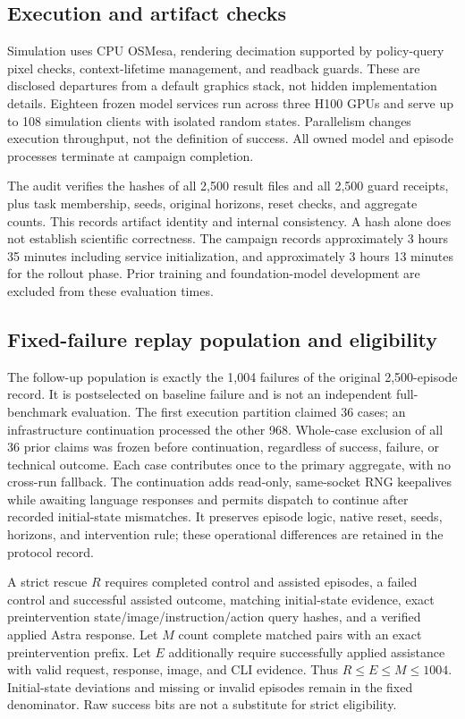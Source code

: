 \documentclass[10pt,twocolumn,letterpaper]{article}
\begin{document}
\subsection{Execution and artifact checks}

Simulation uses CPU OSMesa, rendering decimation supported by policy-query pixel checks, context-lifetime management, and readback guards. These are disclosed departures from a default graphics stack, not hidden implementation details. Eighteen frozen model services run across three H100 GPUs and serve up to 108 simulation clients with isolated random states. Parallelism changes execution throughput, not the definition of success. All owned model and episode processes terminate at campaign completion.


The audit verifies the hashes of all 2,500 result files and all 2,500 guard receipts, plus task membership, seeds, original horizons, reset checks, and aggregate counts. This records artifact identity and internal consistency. A hash alone does not establish scientific correctness. The campaign records approximately 3 hours 35 minutes including service initialization, and approximately 3 hours 13 minutes for the rollout phase. Prior training and foundation-model development are excluded from these evaluation times.


\subsection{Fixed-failure replay population and eligibility}

The follow-up population is exactly the 1,004 failures of the original 2,500-episode record. It is postselected on baseline failure and is not an independent full-benchmark evaluation. The first execution partition claimed 36 cases; an infrastructure continuation processed the other 968. Whole-case exclusion of all 36 prior claims was frozen before continuation, regardless of success, failure, or technical outcome. Each case contributes once to the primary aggregate, with no cross-run fallback. The continuation adds read-only, same-socket RNG keepalives while awaiting language responses and permits dispatch to continue after recorded initial-state mismatches. It preserves episode logic, native reset, seeds, horizons, and intervention rule; these operational differences are retained in the protocol record.


A strict rescue $R$ requires completed control and assisted episodes, a failed control and successful assisted outcome, matching initial-state evidence, exact preintervention state/image/instruction/action query hashes, and a verified applied Astra response. Let $M$ count complete matched pairs with an exact preintervention prefix. Let $E$ additionally require successfully applied assistance with valid request, response, image, and CLI evidence. Thus $R\leq E\leq M\leq1004$. Initial-state deviations and missing or invalid episodes remain in the fixed denominator. Raw success bits are not a substitute for strict eligibility.
\end{document}
